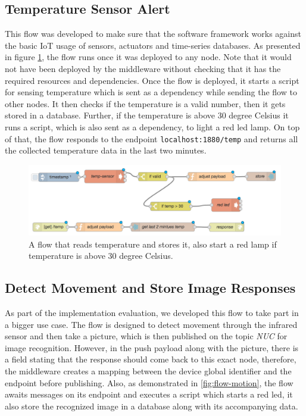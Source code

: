 \subsection{Temperature Sensor Alert}
This flow was developed to make sure that the software framework works against the basic IoT usage of sensors, actuators and time-series databases. As presented in figure \ref{fig:flow-temp}, the flow runs once it was deployed to any node. Note that it would not have been deployed by the middleware without checking that it has the required resources and dependencies. Once the flow is deployed, it starts a script for sensing temperature  which is sent as a dependency while sending the flow to other nodes. It then checks if the temperature is a valid number, then it gets stored in a database. Further, if the temperature is above 30 degree Celsius it runs a script, which is also sent as a dependency, to light a red led lamp. On top of that, the flow responds to the endpoint \verb|localhost:1880/temp| and returns all the collected temperature data in the last two minutes.
 \begin{figure}[H]
	\centering
	\includegraphics[scale=0.6]{images/flow-temp.png}
	\caption{A flow that reads temperature and stores it, also start a red lamp if temperature is above 30 degree Celsius.}
	\label{fig:flow-temp}
\end{figure}



\subsection{Detect Movement and Store Image Responses} \label{subsec:detect-move}
As part of the implementation evaluation, we developed this flow to take part in a bigger use case. The flow is designed to detect movement through the infrared sensor and then take a picture, which is then published on the topic \textit{NUC} for image recognition. However, in the push payload along with the picture, there is a field stating that the response should come back to this exact node, therefore, the middleware creates a mapping between the device global identifier and the endpoint before publishing. Also, as demonstrated in \ref{fig:flow-motion}, the flow awaits messages on its endpoint and executes a script which starts a red led, it also store the recognized image in a database along with its accompanying data. 

